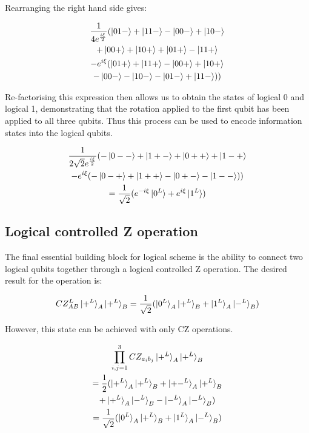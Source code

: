 Rearranging the right hand side gives:

\begin{multline*}
\frac{1}{4 e^{\frac{i \xi}{2}}}(\ket{01-} + \ket{11-} - \ket{00-} + \ket{10-} \\
+ \ket{00+} + \ket{10+} + \ket{01+} - \ket{11+} \\
- e^{i \xi}(\ket{01+} + \ket{11+} - \ket{00+} + \ket{10+} \\
- \ket{00-} - \ket{10-} - \ket{01-} + \ket{11-})) \\
\end{multline*}

Re-factorising this expression then allows us to obtain the states of logical 0 and logical 1, demonstrating that the rotation applied to the first qubit has been applied to all three qubits. Thus this process can be used to encode information states into the logical qubits. 

\begin{multline}
\frac{1}{2 \sqrt{2} e^{\frac{i \xi}{2}}}(- \ket{0--} + \ket{1+-} +\ket{0++} + \ket{1-+} \\
- e^{i \xi}(- \ket{0-+} + \ket{1++} - \ket{0+-} - \ket{1--})) \\ 
= \frac{1}{\sqrt{2}} (e^{- i \xi} \ket{0^{L}} + e^{i \xi} \ket{1^{L}}) \\
\end{multline}


\subsection{Logical controlled Z operation}

The final essential building block for logical scheme is the ability to connect two logical qubits together through a logical controlled Z operation. The desired result for the operation is:

\begin{equation}
\label{eq:logical_cz}
CZ^{L}_{AB} \ket{+^{L}}_{A} \ket{+^{L}}_{B} = \frac{1}{\sqrt{2}} (\ket{0^{L}}_{A}\ket{+^{L}}_{B} + \ket{1^{L}}_A \ket{-^{L}}_{B})
\end{equation}

However, this state can be achieved with only CZ operations.

\begin{multline*}
\prod\limits^{3}_{i, j = 1} CZ_{a_{i}b_{j}} \ket{+^{L}}_{A} \ket{+^{L}}_{B} \\ 
= \frac{1}{2} (\ket{+^{L}}_{A} \ket{+^{L}}_{B} + \ket{+-^{L}}_{A} \ket{+^{L}}_{B} \\
 + \ket{+^{L}}_{A} \ket{-^{L}}_{B} - \ket{-^{L}}_{A} \ket{-^{L}}_{B}) \\
= \frac{1}{\sqrt{2}} (\ket{0^{L}}_{A}\ket{+^{L}}_{B} + \ket{1^{L}}_A \ket{-^{L}}_{B}) \\
\end{multline*}

